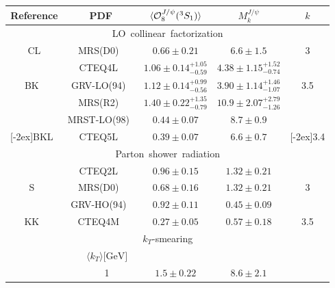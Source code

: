\begin{table}
\begin{center}
\renewcommand{\arraystretch}{1.3}
\begin{tabular}{|c|cc|ccc|}
\hline\hline
 \mbox{Reference} & \multicolumn{2}{c|}{\mbox{PDF}} & $\langle
 {\cal{O}}^{J/\psi}_8({}^3S_1) \rangle$ &
 $M_{k}^{J/\psi} $ & $ k $ \\ \hline\hline
 \multicolumn{6}{|c|}{\mbox{LO collinear factorization}} \\ \hline
 {\rm CL} \cite{Cho:1995ce} &
 \multicolumn{2}{c|}{\mbox{MRS(D0)~\cite{Martin:1992zi}}} & $ 0.66 \pm
 0.21 $ & $6.6 \pm 1.5$ & 3 \\ \hline &
 \multicolumn{2}{c|}{\mbox{CTEQ4L~\cite{Lai:1996mg}}} & $1.06 \pm
 0.14^{+1.05}_{-0.59}$ & $4.38 \pm 1.15^{+1.52}_{-0.74}$ & \\
 {\rm BK~\cite{Beneke:1996yw}} &
 \multicolumn{2}{c|}{\mbox{GRV-LO(94)~\cite{Gluck:1994uf}}} & $ 1.12 \pm
 0.14^{+0.99}_{-0.56} $ & $3.90 \pm 1.14^{+1.46}_{-1.07}$ & 3.5 \\ &
 \multicolumn{2}{c|}{\mbox{MRS(R2)~\cite{Martin:1996as}}} & $ 1.40 \pm
 0.22^{+1.35}_{-0.79} $ & $10.9 \pm 2.07^{+2.79}_{-1.26}$ & \\ \hline &
 \multicolumn{2}{c|}{\mbox{MRST-LO(98)~\cite{Martin:1998sq}}} & $ 0.44
 \pm 0.07 $ & $ 8.7 \pm 0.9$  & \\
 \raisebox{2ex}[-2ex]{BKL~\cite{Braaten:1999qk}} &
 \multicolumn{2}{c|}{\mbox{CTEQ5L~\cite{Lai:1999wy}}} & $0.39 \pm 0.07$
 & $6.6 \pm 0.7 $  & \raisebox{2ex}[-2ex]{3.4} \\[0.5mm] \hline\hline
 \multicolumn{6}{|c|}{\mbox{Parton shower radiation}} \\ \hline &
 \multicolumn{2}{c|}{\mbox{CTEQ2L~\cite{Tung:ua}}} & $0.96 \pm 0.15$
 & $1.32 \pm 0.21 $ & \\ {\rm S~\cite{Sanchis-Lozano:1999um}} &
 \multicolumn{2}{c|}{\mbox{MRS(D0)~\cite{Martin:1992zi}}} & $0.68 \pm
 0.16$ & $1.32 \pm 0.21$ & 3  \\ &
 \multicolumn{2}{c|}{\mbox{GRV-HO(94)~\cite{Gluck:1994uf}}} & $0.92 \pm
 0.11$ & $0.45 \pm 0.09$ & \\ \hline {\rm KK~\cite{Kniehl:1998qy}} &
 \multicolumn{2}{c|}{\mbox{CTEQ4M~\cite{Lai:1996mg}}} & $0.27 \pm 0.05$
 & $0.57 \pm 0.18 $ & 3.5 \\[0.5mm] \hline \hline
 \multicolumn{6}{|c|}{\mbox{$k_T$-smearing}} \\ \hline & & $ \langle k_T
 \rangle \mbox{[GeV]} $ & & & \\ & & 1 & $1.5\pm 0.22$ & $8.6\pm 2.1$ & \\

\end{tabular}
\end{center}
\end{table}
